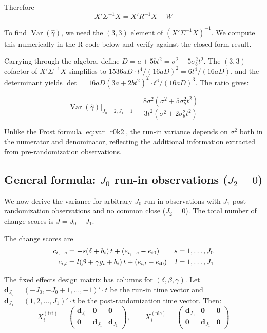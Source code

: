 \documentclass[
  11pt,
]{article}
\begin{document}
Therefore \begin{equation}
  X'\Sigma^{-1}X = X'R^{-1}X - W
\end{equation}

To find \(\mathop{\mathrm{Var}}(\hat{\gamma})\), we need the \((3,3)\)
element of \((X'\Sigma^{-1}X)^{-1}\). We compute this numerically in the
R code below and verify against the closed-form result.

Carrying through the algebra, define \(D = a + 5bt^2 =
\sigma^2 + 5\sigma_b^2 t^2\). The \((3,3)\) cofactor of
\(X'\Sigma^{-1}X\) simplifies to \(1536aD \cdot
t^4/(16aD)^2 = 6t^4/(16aD)\), and the determinant yields
\(\det = 16aD(3a+2bt^2)^2 \cdot t^6/(16aD)^3\). The ratio gives:

\begin{equation}
  \boxed{
    \mathop{\mathrm{Var}}(\hat{\gamma})\big|_{J_0=2,J_1=1}
    = \frac{8\sigma^2(\sigma^2 + 5\sigma_b^2 t^2)}
           {3t^2(\sigma^2 + 2\sigma_b^2 t^2)}
  }
  \label{eq:var_r2k1}
\end{equation}

Unlike the Frost formula \eqref{eq:var_r0k2}, the run-in variance
depends on \(\sigma^2\) both in the numerator and denominator,
reflecting the additional information extracted from pre-randomization
observations.

\subsection{\texorpdfstring{General formula: \(J_0\) run-in observations
(\(J_2=0\))}{General formula: J\_0 run-in observations (J\_2=0)}}\label{general-formula-j_0-run-in-observations-j_20}

We now derive the variance for arbitrary \(J_0\) run-in observations
with \(J_1\) post-randomization observations and no common close
(\(J_2 = 0\)). The total number of change scores is \(J = J_0 + J_1\).

The change scores are \begin{align}
  c_{i,-s} &= -s(\delta + b_i)\,t + (e_{i,-s} - e_{i0})
    & s &= 1,\ldots,J_0 \notag \\
  c_{i,l}  &= l(\beta + \gamma g_i + b_i)\,t
    + (e_{i,l} - e_{i0})
    & l &= 1,\ldots,J_1
\end{align}

The fixed effects design matrix has columns for
\((\delta, \beta, \gamma)\). Let \(\mathbf{d}_{J_0} = (-J_0, -J_0+1,
\ldots, -1)' \cdot t\) be the run-in time vector and
\(\mathbf{d}_{J_1} = (1, 2, \ldots, J_1)' \cdot t\) be the
post-randomization time vector. Then: \[
  X_i^{(\text{trt})} = \begin{pmatrix}
    \mathbf{d}_{J_0} & \mathbf{0} & \mathbf{0} \\
    \mathbf{0}   & \mathbf{d}_{J_1} & \mathbf{d}_{J_1}
  \end{pmatrix}, \qquad
  X_i^{(\text{plc})} = \begin{pmatrix}
    \mathbf{d}_{J_0} & \mathbf{0} & \mathbf{0} \\
    \mathbf{0}   & \mathbf{d}_{J_1} & \mathbf{0}
  \end{pmatrix}
\]
\end{document}

